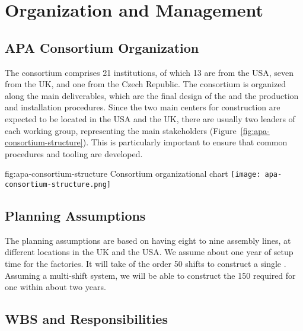 \section{Organization and Management}
\label{sec:fdsp-apa-org}

\subsection{APA Consortium Organization}
\label{sec:fdsp-apa-org-consortium}

The  consortium comprises \num{21} institutions, of which \num{13} are from the USA, seven from the UK, and one from the Czech Republic. The consortium is organized along the main deliverables, which are the final design of the  and the  production and installation procedures. Since the two main centers for  construction are expected to be located in the USA and the UK, there are usually two leaders of each working group, representing the main stakeholders (Figure~\ref{fig:apa-consortium-structure}). This is particularly important to ensure that common procedures and tooling are developed. 

\begin{dunefigure}{fig:apa-consortium-structure}
{ Consortium organizational chart}
\texttt{[image: apa-consortium-structure.png]}
\end{dunefigure}


\subsection{Planning Assumptions}
\label{sec:fdsp-apa-org-assmp}

The planning assumptions are based on having eight to nine  assembly lines, at different locations in the UK and the USA. 
We assume about one year of setup time for the factories.
It will take of the order \num{50} shifts to construct a single . Assuming a multi-shift system, we will be able to construct the \num{150}  required for one  %
within about two years.

\subsection{WBS and Responsibilities}
\label{sec:fdsp-apa-org-wbs}

